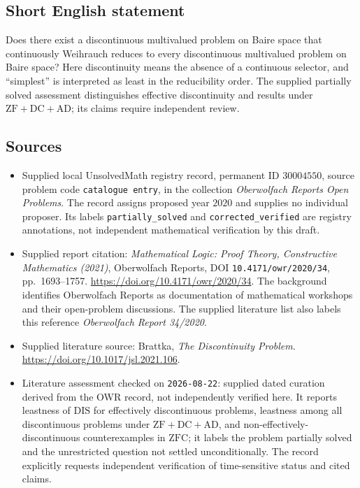 \documentclass[11pt]{article}
\begin{document}
\subsection{Short English statement}
Does there exist a discontinuous multivalued problem on Baire space that continuously Weihrauch reduces to every discontinuous multivalued problem on Baire space? Here discontinuity means the absence of a continuous selector, and ``simplest'' is interpreted as least in the reducibility order. The supplied partially solved assessment distinguishes effective discontinuity and results under \(\mathrm{ZF}+\mathrm{DC}+\mathrm{AD}\); its claims require independent review.
\subsection{Sources}
\begin{itemize}
\item Supplied local UnsolvedMath registry record, permanent ID \(30004550\), source problem code \texttt{catalogue entry}, in the collection \emph{Oberwolfach Reports Open Problems}. The record assigns proposed year \(2020\) and supplies no individual proposer. Its labels \texttt{partially\_solved} and \texttt{corrected\_verified} are registry annotations, not independent mathematical verification by this draft.
\item Supplied report citation: \emph{Mathematical Logic: Proof Theory, Constructive Mathematics (2021)}, Oberwolfach Reports, DOI \texttt{10.4171/owr/2020/34}, pp.~1693--1757. \url{https://doi.org/10.4171/owr/2020/34}. The background identifies Oberwolfach Reports as documentation of mathematical workshops and their open-problem discussions. The supplied literature list also labels this reference \emph{Oberwolfach Report 34/2020}.
\item Supplied literature source: Brattka, \emph{The Discontinuity Problem}. \url{https://doi.org/10.1017/jsl.2021.106}.
\item Literature assessment checked on \texttt{2026-08-22}: supplied dated curation derived from the OWR record, not independently verified here. It reports leastness of \(\mathrm{DIS}\) for effectively discontinuous problems, leastness among all discontinuous problems under \(\mathrm{ZF}+\mathrm{DC}+\mathrm{AD}\), and non-effectively-discontinuous counterexamples in \(\mathrm{ZFC}\); it labels the problem partially solved and the unrestricted question not settled unconditionally. The record explicitly requests independent verification of time-sensitive status and cited claims.
\end{itemize}
\end{document}
